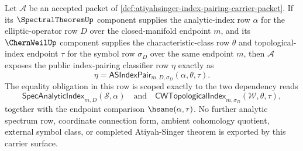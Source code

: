 \begin{theorem}
\label{thm:atiyahsinger-index-pairing-carrier-surface}
Let $\mathcal{A}$ be an accepted packet of \autoref{def:atiyahsinger-index-pairing-carrier-packet}. If its $\SpectralTheoremUp$ component supplies the analytic-index row $\alpha$ for the elliptic-operator row $D$ over the closed-manifold endpoint $m$, and its $\ChernWeilUp$ component supplies the characteristic-class row $\theta$ and topological-index endpoint $\tau$ for the symbol row $\sigma_D$ over the same endpoint $m$, then $\mathcal{A}$ exposes the public index-pairing classifier row $\eta$ exactly as
$$
\eta=\mathsf{ASIndexPair}_{m,D,\sigma_D}(\alpha,\theta,\tau).
$$
The equality obligation in this row is scoped exactly to the two dependency reads
$$
\mathsf{SpecAnalyticIndex}_{m,D}(\mathcal{S},\alpha)
\quad\text{and}\quad
\mathsf{CWTopologicalIndex}_{m,\sigma_D}(\mathcal{W},\theta,\tau),
$$
together with the endpoint comparison $\hsame(\alpha,\tau)$. No further analytic spectrum row, coordinate connection form, ambient cohomology quotient, external symbol class, or completed Atiyah-Singer theorem is exported by this carrier surface.
\end{theorem}
